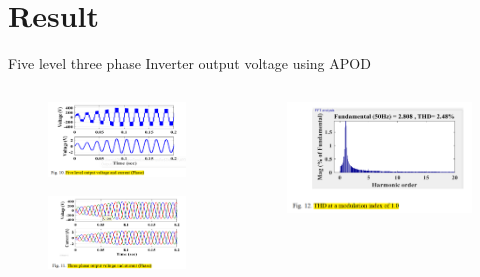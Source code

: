 \documentclass[
	11pt, %
]{beamer}
\begin{document}
\section{Result}
\begin{frame}{Five level three phase Inverter output voltage using APOD}
	\begin{columns}
	\begin{column}{0.5\textwidth}
		\begin{figure}
			\includegraphics[width=1\linewidth]{APOD_V_C.png}
		\end{figure}
		\begin{figure}
			\includegraphics[width=1\linewidth]{APOD_V_C_3.png}
		\end{figure}
	\end{column}
	\begin{column}{0.5\textwidth}
		\begin{figure}
			\includegraphics[width=1\linewidth]{APOD_THD.png}

\end{figure}
\end{column}
\end{columns}
\end{frame}
\end{document}
